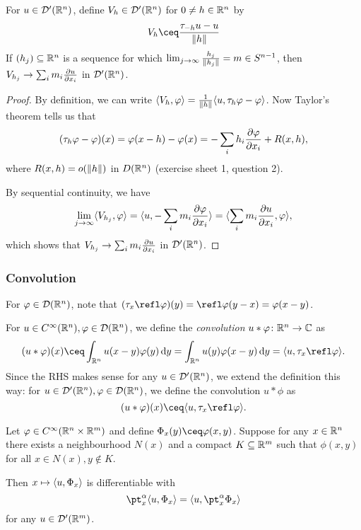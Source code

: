 \begin{lemma}
    For $u \in \mathcal D'(\mathbb R^n)$, define $V_h \in \mathcal D'(\mathbb R^n)$ for $0 \neq h \in \mathbb R^n$ by
    \[
    V_h \ceq \frac{\tau_{-h}u - u}{\norm{h}}
    \]
    If $(h_j) \subseteq \mathbb R^n$ is a sequence for which $\lim_{j \to \infty} \frac{h_j}{\norm{h_j}} = m \in S^{n-1}$, then $V_{h_j} \to \sum_i m_i \pdv{u}{x_i}$ in $\mathcal D'(\mathbb R^n)$. 
\end{lemma}

\begin{proof}
    By definition, we can write $\langle V_h, \varphi\rangle = \frac{1}{\norm{h}} \langle u, \tau_h\varphi - \varphi\rangle$. Now Taylor's theorem tells us that
    \[
    (\tau_h\varphi - \varphi)(x) = \varphi(x - h) - \varphi(x) = - \sum_i h_i \pdv{\varphi}{x_i}(x) + R(x, h),
    \]
    where $R(x, h) = o(\norm{h})$ in $D(\mathbb R^n)$ (exercise sheet 1, question 2). 
    
    By sequential continuity, we have
    \[
    \lim_{j \to \infty} \langle V_{h_j}, \varphi\rangle = \langle u, - \sum_i m_i \pdv{\varphi}{x_i}\rangle = \langle\sum_i m_i \pdv{u}{x_i}, \varphi\rangle, 
    \]
    which shows that $V_{h_j} \to \sum_i m_i \pdv{u}{x_i}$ in $\mathcal D'(\mathbb R^n)$. 
\end{proof}

\subsubsection{Convolution}
For $\varphi \in \mathcal D(\mathbb R^n)$, note that $(\tau_x \refl\phi)(y) = \refl\phi(y-x) = \phi(x-y)$. 
\begin{definition}
    For $u \in C^\infty(\mathbb R^n), \varphi \in \mathcal D(\mathbb R^n)$, we define the \emph{convolution} $u * \varphi \colon \mathbb R^n \to \mathbb C$ as
    \[
    (u * \phi)(x) \ceq \int_{\RR^n} u(x-y) \phi(y) \dd{y} = \int_{\RR^n} u(y) \phi(x - y) \dd{y} = \ang{u, \tau_x \refl\phi}. 
    \]
    Since the RHS makes sense for any $u \in \mathcal D'(\mathbb R^n)$, we extend the definition this way: for $u \in \mathcal D'(\mathbb R^n), \varphi \in \mathcal D(\mathbb R^n)$, we define the convolution $u * \phi$ as
    \[
    (u * \phi)(x) \ceq \ang{u, \tau_x\refl\phi}. 
    \]
\end{definition}


\begin{lemma}
    Let $\varphi \in C^\infty(\mathbb R^n \times \mathbb R^m)$ and define $\Phi_x(y) \ceq \phi(x, y)$. Suppose for any $x \in \mathbb R^n$ there exists a neighbourhood $N(x)$ and a compact $K \subseteq \mathbb R^m$ such that $\phi(x, y)$ for all $x \in N(x), y \notin K$. 
    
    Then $x \mapsto \langle u, \Phi_x\rangle$ is differentiable with
    \[
    \pt_x^\alpha \ang{u, \Phi_x} = \ang{u, \pt_x^\alpha \Phi_x}
    \]
    for any $u \in \mathcal D'(\mathbb R^m)$. 
\end{lemma}

